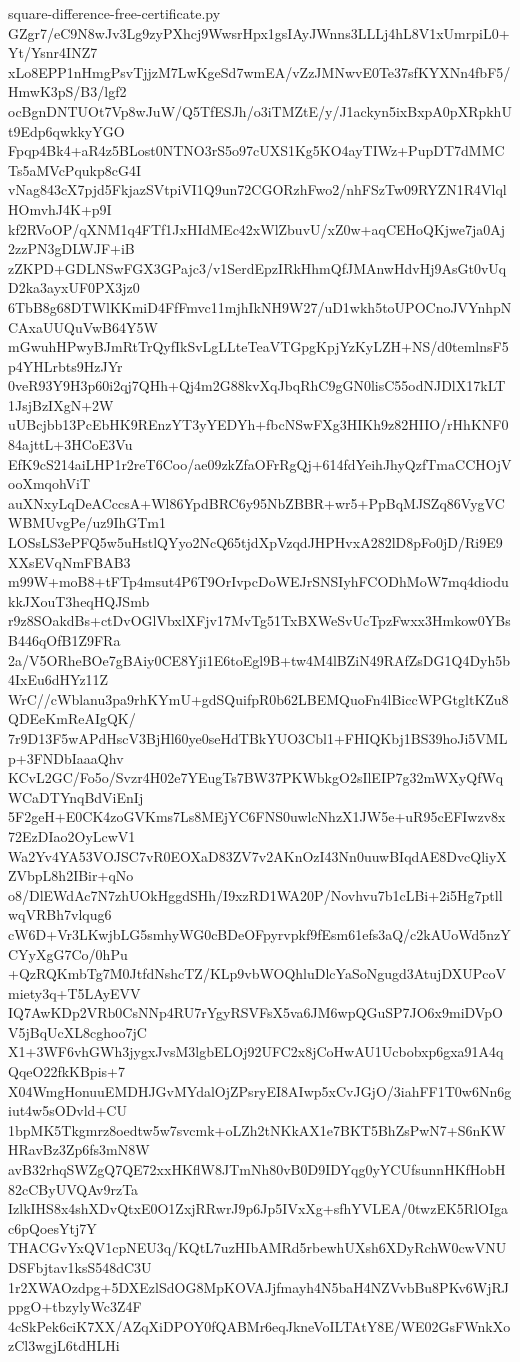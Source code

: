 \documentclass[11pt]{article}
\theoremstyle{definition}
\theoremstyle{remark}
\begin{document}
\begin{filecontents*}[overwrite]{square-difference-free-certificate.py}
GZgr7/eC9N8wJv3Lg9zyPXhcj9WwsrHpx1gsIAyJWnns3LLLj4hL8V1xUmrpiL0+Yt/Ysnr4INZ7
xLo8EPP1nHmgPsvTjjzM7LwKgeSd7wmEA/vZzJMNwvE0Te37sfKYXNn4fbF5/HmwK3pS/B3/lgf2
ocBgnDNTUOt7Vp8wJuW/Q5TfESJh/o3iTMZtE/y/J1ackyn5ixBxpA0pXRpkhUt9Edp6qwkkyYGO
Fpqp4Bk4+aR4z5BLost0NTNO3rS5o97cUXS1Kg5KO4ayTIWz+PupDT7dMMCTs5aMVcPqukp8cG4I
vNag843cX7pjd5FkjazSVtpiVI1Q9un72CGORzhFwo2/nhFSzTw09RYZN1R4VlqlHOmvhJ4K+p9I
kf2RVoOP/qXNM1q4FTf1JxHIdMEc42xWlZbuvU/xZ0w+aqCEHoQKjwe7ja0Aj2zzPN3gDLWJF+iB
zZKPD+GDLNSwFGX3GPajc3/v1SerdEpzIRkHhmQfJMAnwHdvHj9AsGt0vUqD2ka3ayxUF0PX3jz0
6TbB8g68DTWlKKmiD4FfFmvc11mjhIkNH9W27/uD1wkh5toUPOCnoJVYnhpNCAxaUUQuVwB64Y5W
mGwuhHPwyBJmRtTrQyfIkSvLgLLteTeaVTGpgKpjYzKyLZH+NS/d0temlnsF5p4YHLrbts9HzJYr
0veR93Y9H3p60i2qj7QHh+Qj4m2G88kvXqJbqRhC9gGN0lisC55odNJDlX17kLT1JsjBzIXgN+2W
uUBcjbb13PcEbHK9REnzYT3yYEDYh+fbcNSwFXg3HIKh9z82HIIO/rHhKNF084ajttL+3HCoE3Vu
EfK9cS214aiLHP1r2reT6Coo/ae09zkZfaOFrRgQj+614fdYeihJhyQzfTmaCCHOjVooXmqohViT
auXNxyLqDeACccsA+Wl86YpdBRC6y95NbZBBR+wr5+PpBqMJSZq86VygVCWBMUvgPe/uz9IhGTm1
LOSsLS3ePFQ5w5uHstlQYyo2NcQ65tjdXpVzqdJHPHvxA282lD8pFo0jD/Ri9E9XXsEVqNmFBAB3
m99W+moB8+tFTp4msut4P6T9OrIvpcDoWEJrSNSIyhFCODhMoW7mq4diodukkJXouT3heqHQJSmb
r9z8SOakdBs+ctDvOGlVbxlXFjv17MvTg51TxBXWeSvUcTpzFwxx3Hmkow0YBsB446qOfB1Z9FRa
2a/V5ORheBOe7gBAiy0CE8Yji1E6toEgl9B+tw4M4lBZiN49RAfZsDG1Q4Dyh5b4IxEu6dHYz11Z
WrC//cWblanu3pa9rhKYmU+gdSQuifpR0b62LBEMQuoFn4lBiccWPGtgltKZu8QDEeKmReAIgQK/
7r9D13F5wAPdHscV3BjHl60ye0seHdTBkYUO3Cbl1+FHIQKbj1BS39hoJi5VMLp+3FNDbIaaaQhv
KCvL2GC/Fo5o/Svzr4H02e7YEugTs7BW37PKWbkgO2sIlEIP7g32mWXyQfWqWCaDTYnqBdViEnIj
5F2geH+E0CK4zoGVKms7Ls8MEjYC6FNS0uwlcNhzX1JW5e+uR95cEFIwzv8x72EzDIao2OyLcwV1
Wa2Yv4YA53VOJSC7vR0EOXaD83ZV7v2AKnOzI43Nn0uuwBIqdAE8DvcQliyXZVbpL8h2IBir+qNo
o8/DlEWdAc7N7zhUOkHggdSHh/I9xzRD1WA20P/Novhvu7b1cLBi+2i5Hg7ptllwqVRBh7vlqug6
cW6D+Vr3LKwjbLG5smhyWG0cBDeOFpyrvpkf9fEsm61efs3aQ/c2kAUoWd5nzYCYyXgG7Co/0hPu
+QzRQKmbTg7M0JtfdNshcTZ/KLp9vbWOQhluDlcYaSoNgugd3AtujDXUPcoVmiety3q+T5LAyEVV
IQ7AwKDp2VRb0CsNNp4RU7rYgyRSVFsX5va6JM6wpQGuSP7JO6x9miDVpOV5jBqUcXL8cghoo7jC
X1+3WF6vhGWh3jygxJvsM3lgbELOj92UFC2x8jCoHwAU1Ucbobxp6gxa91A4qQqeO22fkKBpis+7
X04WmgHonuuEMDHJGvMYdalOjZPsryEI8AIwp5xCvJGjO/3iahFF1T0w6Nn6giut4w5sODvld+CU
1bpMK5Tkgmrz8oedtw5w7svcmk+oLZh2tNKkAX1e7BKT5BhZsPwN7+S6nKWHRavBz3Zp6fs3mN8W
avB32rhqSWZgQ7QE72xxHKflW8JTmNh80vB0D9IDYqg0yYCUfsunnHKfHobH82cCByUVQAv9rzTa
IzlkIHS8x4shXDvQtxE0O1ZxjRRwrJ9p6Jp5IVxXg+sfhYVLEA/0twzEK5RlOIgac6pQoesYtj7Y
THACGvYxQV1cpNEU3q/KQtL7uzHIbAMRd5rbewhUXsh6XDyRchW0cwVNUDSFbjtav1ksS548dC3U
1r2XWAOzdpg+5DXEzlSdOG8MpKOVAJjfmayh4N5baH4NZVvbBu8PKv6WjRJppgO+tbzylyWc3Z4F
4cSkPek6ciK7XX/AZqXiDPOY0fQABMr6eqJkneVoILTAtY8E/WE02GsFWnkXozCl3wgjL6tdHLHi

\end{filecontents*}
\end{document}

